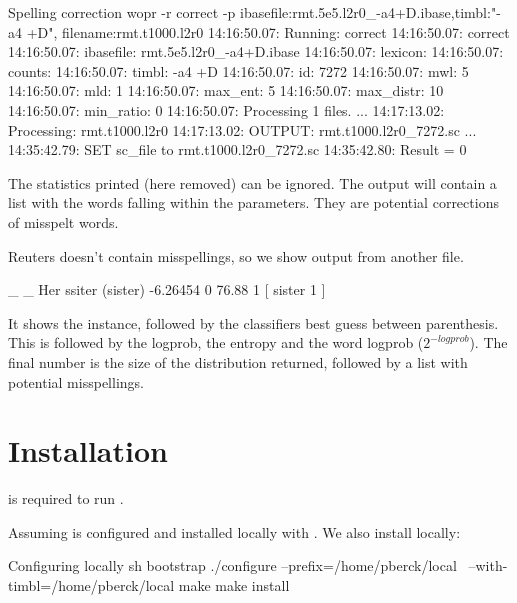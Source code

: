 \documentclass[a4paper,10pt,twoside]{report}
\begin{document}
\begin{bash}{Spelling correction}
wopr -r correct -p ibasefile:rmt.5e5.l2r0_-a4+D.ibase,timbl:"-a4 +D",
                   filename:rmt.t1000.l2r0
14:16:50.07: Running: correct
14:16:50.07: correct
14:16:50.07:  ibasefile:  rmt.5e5.l2r0_-a4+D.ibase
14:16:50.07:  lexicon:    
14:16:50.07:  counts:     
14:16:50.07:  timbl:      -a4 +D
14:16:50.07:  id:         7272
14:16:50.07:  mwl:        5
14:16:50.07:  mld:        1
14:16:50.07:  max_ent:    5
14:16:50.07:  max_distr:  10
14:16:50.07:  min_ratio:  0
14:16:50.07: Processing 1 files.
...
14:17:13.02: Processing: rmt.t1000.l2r0
14:17:13.02: OUTPUT:     rmt.t1000.l2r0_7272.sc
...
14:35:42.79:  SET sc_file to rmt.t1000.l2r0_7272.sc
14:35:42.80: Result = 0
\end{bash}

The statistics printed (here removed) can be ignored. The output will
contain a list with the words falling within the parameters. They are
potential corrections of misspelt words.

Reuters doesn't contain misspellings, so we show output from another
file.

\begin{wout}{}
_ _ Her ssiter (sister) -6.26454 0 76.88 1 [ sister 1 ]
\end{wout}

It shows the instance, followed by the classifiers best guess between
parenthesis. This is followed by the logprob, the entropy and the word
logprob ($2^{-logprob}$). The final number is the size of the \Timbl{}
distribution returned, followed by a list with potential misspellings.

\chapter{Installation}

\Timbl{} is required to run \wopr{}.

Assuming \Timbl{} is configured and installed locally with
. We also install \wopr{} locally:

\begin{bash}{Configuring \wopr{} locally}
sh bootstrap
./configure --prefix=/home/pberck/local \
            --with-timbl=/home/pberck/local
make
make install
\end{bash}
\end{document}
